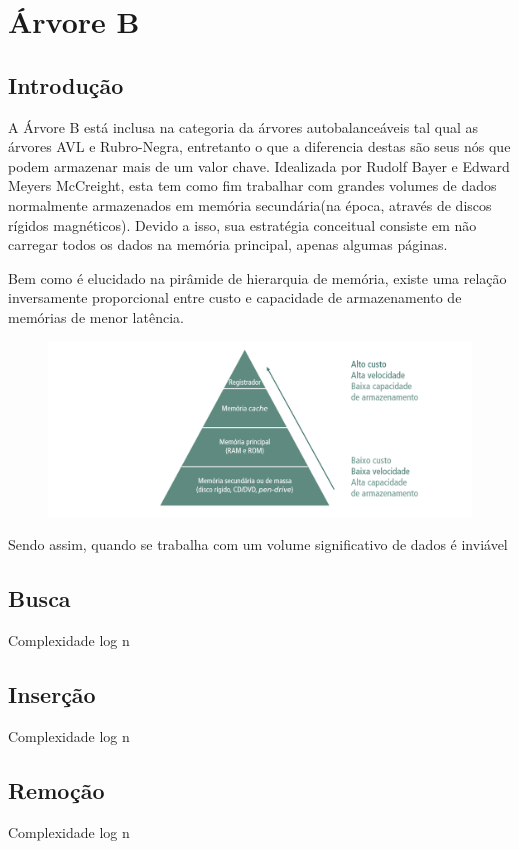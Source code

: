 \chapter{Árvore B}
\label{ch:heap} %

% 
\section*{Introdução}
A Árvore B está inclusa na categoria da árvores autobalanceáveis tal qual as árvores AVL e Rubro-Negra, entretanto o que a diferencia destas são seus nós que podem armazenar mais de um valor chave. Idealizada por Rudolf Bayer e Edward Meyers McCreight, esta tem como fim trabalhar com grandes volumes de dados normalmente armazenados em memória secundária(na época, através de discos rígidos magnéticos). Devido a isso, sua estratégia conceitual consiste em não carregar todos os dados na memória principal, apenas algumas páginas.

Bem como é elucidado na pirâmide de hierarquia de memória, existe uma relação inversamente proporcional entre custo e capacidade de armazenamento de memórias de menor latência.

\begin{figure}[!ht]
	\centering
	\includegraphics[scale=0.7]{figures/piramide.png}
\end{figure}

Sendo assim, quando se trabalha com um volume significativo de dados é inviável 
\section*{Busca}
Complexidade log n
\section*{Inserção}
Complexidade log n
\section*{Remoção}
Complexidade log n


%
